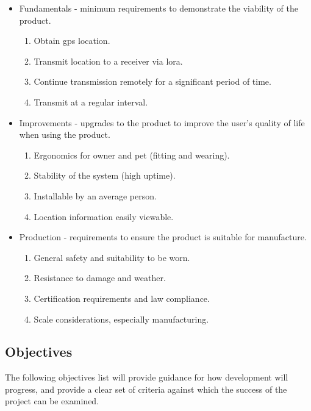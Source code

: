 \begin{itemize}
    \item Fundamentals - minimum requirements to demonstrate the viability 
            of the product.
        \begin{enumerate}
            \item Obtain \acrshort{gps} location.
            \item Transmit location to a receiver via \gls{lora}.
            \item Continue transmission remotely for a significant period of time.
            \item Transmit at a regular interval.
        \end{enumerate}
    \item Improvements - upgrades to the product to improve the user's 
            quality of life when using the product.
        \begin{enumerate}
            \item Ergonomics for owner and pet (fitting and wearing). 
            \item Stability of the system (high uptime).
            \item Installable by an average person.
            \item Location information easily viewable. 
        \end{enumerate}
    \item Production - requirements to ensure the product is suitable 
            for manufacture.
        \begin{enumerate}
            \item General safety and suitability to be worn.
            \item Resistance to damage and weather.
            \item Certification requirements and law compliance.
            \item Scale considerations, especially manufacturing.
        \end{enumerate}
\end{itemize}

\subsection{Objectives}
\label{sec:objectives}
The following objectives list will provide guidance for how development 
will progress, and provide a clear set of criteria against which the success of the 
project can be examined. 

